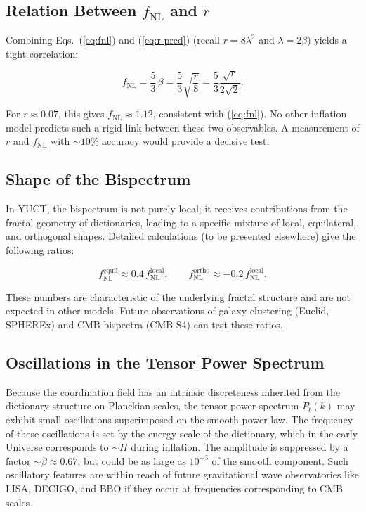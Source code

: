 \documentclass[12pt]{article}
\theoremstyle{remark}
\begin{document}
	\subsection{Relation Between $f_{\text{NL}}$ and $r$}
	
	Combining Eqs.~(\ref{eq:fnl}) and (\ref{eq:r-pred}) (recall $r = 8\lambda^2$ and $\lambda = 2\beta$) yields a tight correlation:
	
	\begin{equation}
		f_{\text{NL}} = \frac{5}{3}\,\beta = \frac{5}{3}\sqrt{\frac{r}{8}} = \frac{5}{3}\frac{\sqrt{r}}{2\sqrt{2}}.
		\label{eq:fnl-r}
	\end{equation}
	
	For $r \approx 0.07$, this gives $f_{\text{NL}} \approx 1.12$, consistent with (\ref{eq:fnl}). No other inflation model predicts such a rigid link between these two observables. A measurement of $r$ and $f_{\text{NL}}$ with $\sim 10\%$ accuracy would provide a decisive test.
	
	\subsection{Shape of the Bispectrum}
	
	In YUCT, the bispectrum is not purely local; it receives contributions from the fractal geometry of dictionaries, leading to a specific mixture of local, equilateral, and orthogonal shapes. Detailed calculations (to be presented elsewhere) give the following ratios:
	
	\begin{equation}
		f_{\text{NL}}^{\text{equil}} \approx 0.4\, f_{\text{NL}}^{\text{local}}, \qquad
		f_{\text{NL}}^{\text{ortho}} \approx -0.2\, f_{\text{NL}}^{\text{local}}.
		\label{eq:fnl-shapes}
	\end{equation}
	
	These numbers are characteristic of the underlying fractal structure and are not expected in other models. Future observations of galaxy clustering (Euclid, SPHEREx) and CMB bispectra (CMB‑S4) can test these ratios.
	
	\subsection{Oscillations in the Tensor Power Spectrum}
	
	Because the coordination field has an intrinsic discreteness inherited from the dictionary structure on Planckian scales, the tensor power spectrum $P_t(k)$ may exhibit small oscillations superimposed on the smooth power law. The frequency of these oscillations is set by the energy scale of the dictionary, which in the early Universe corresponds to $\sim H$ during inflation. The amplitude is suppressed by a factor $\sim \beta \approx 0.67$, but could be as large as $10^{-3}$ of the smooth component. Such oscillatory features are within reach of future gravitational wave observatories like LISA, DECIGO, and BBO if they occur at frequencies corresponding to CMB scales.
	
\end{document}
